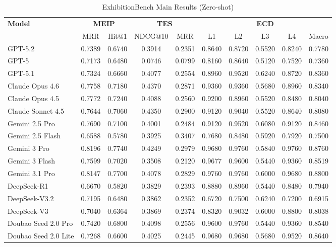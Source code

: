 \begin{table}[ht]
\centering
\caption{ExhibitionBench Main Results (Zero-shot)}
\label{tab:main-results}
\begin{tabular}{l|cc|cc|ccccc}
\toprule
\textbf{Model} & \multicolumn{2}{c|}{\textbf{MEIP}} & \multicolumn{2}{c|}{\textbf{TES}} & \multicolumn{5}{c}{\textbf{ECD}} \\
 & MRR & Hit@1 & NDCG@10 & MRR & L1 & L2 & L3 & L4 & Macro \\
\midrule
GPT-5.2 & 0.7389 & 0.6740 & 0.3914 & 0.2351 & 0.8640 & 0.8720 & 0.5520 & 0.8240 & 0.7780 \\
GPT-5 & 0.7173 & 0.6480 & 0.0746 & 0.0799 & 0.8160 & 0.8640 & 0.5120 & 0.7520 & 0.7360 \\
GPT-5.1 & 0.7324 & 0.6660 & 0.4077 & 0.2554 & 0.8960 & 0.9520 & 0.6240 & 0.8720 & 0.8360 \\
Claude Opus 4.6 & 0.7758 & 0.7180 & 0.4370 & 0.2871 & 0.9360 & 0.9360 & 0.5680 & 0.8960 & 0.8340 \\
Claude Opus 4.5 & 0.7772 & 0.7240 & 0.4088 & 0.2560 & 0.9200 & 0.8960 & 0.5520 & 0.8480 & 0.8040 \\
Claude Sonnet 4.5 & 0.7644 & 0.7060 & 0.4350 & 0.2900 & 0.9120 & 0.9040 & 0.5520 & 0.8640 & 0.8080 \\
Gemini 2.5 Pro & 0.7690 & 0.7100 & 0.4001 & 0.2484 & 0.9120 & 0.9520 & 0.6080 & 0.9120 & 0.8460 \\
Gemini 2.5 Flash & 0.6588 & 0.5780 & 0.3925 & 0.3407 & 0.7680 & 0.8480 & 0.5920 & 0.7920 & 0.7500 \\
Gemini 3 Pro & 0.8196 & 0.7740 & 0.4249 & 0.2979 & 0.9680 & 0.9760 & 0.5840 & 0.9760 & 0.8760 \\
Gemini 3 Flash & 0.7599 & 0.7020 & 0.3508 & 0.2120 & 0.9677 & 0.9600 & 0.5440 & 0.9360 & 0.8519 \\
Gemini 3.1 Pro & 0.8147 & 0.7700 & 0.4078 & 0.2829 & 0.9760 & 0.9760 & 0.6000 & 0.9680 & 0.8800 \\
DeepSeek-R1 & 0.6670 & 0.5820 & 0.3829 & 0.2393 & 0.8880 & 0.8960 & 0.5440 & 0.8480 & 0.7940 \\
DeepSeek-V3.2 & 0.7195 & 0.6480 & 0.3862 & 0.2352 & 0.6720 & 0.7500 & 0.6240 & 0.7200 & 0.6915 \\
DeepSeek-V3 & 0.7040 & 0.6364 & 0.3869 & 0.2374 & 0.8320 & 0.9032 & 0.6000 & 0.8800 & 0.8038 \\
Doubao Seed 2.0 Pro & 0.7420 & 0.6800 & 0.4098 & 0.2556 & 0.9600 & 0.9760 & 0.5440 & 0.9360 & 0.8540 \\
Doubao Seed 2.0 Lite & 0.7268 & 0.6600 & 0.4025 & 0.2445 & 0.9680 & 0.9680 & 0.5680 & 0.9520 & 0.8640 \\

\end{tabular}
\end{table}
